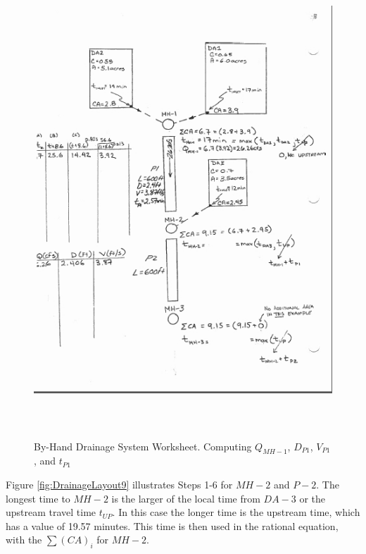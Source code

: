 \documentclass[12pt]{article}
\begin{document}
\begin{figure}[ht!] %
\centering
   \includegraphics[height=7in]{DrainageLayout8.jpg}
   \caption{By-Hand Drainage System Worksheet. Computing $Q_{MH-1}$, $D_{P1}$, $V_{P1}$, and $t_{P1}$}
   \label{fig:DrainageLayout8} 
\end{figure}
\clearpage
Figure \ref{fig:DrainageLayout9} illustrates Steps 1-6 for $MH-2$ and $P-2$. 
The longest time to $MH-2$ is the larger of the local time from $DA-3$ or the upstream travel time $t_{UP}$.
In this case the longer time is the upstream time, which has a value of 19.57 minutes.
This time is then used in the rational equation, with the $\sum (CA)_i$ for $MH-2$.
\end{document}
